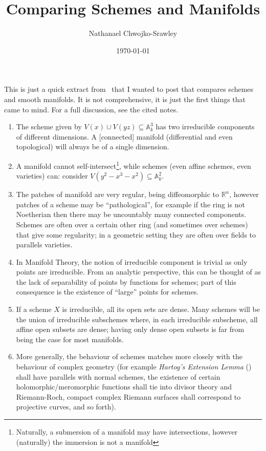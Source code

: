 \documentclass{article}
\title{Comparing Schemes and Manifolds}
\author{Nathanael Chwojko-Srawley}
\date{\today}
\renewcommand{\maketitle}{
    \quad
    \vspace{1em}
  \begin{center}
      \LARGE\bfseries \thetitle \par
      \vspace{0.6em}
      \large
  \end{center}
    \vspace{1em}
}
\newcommand{\A}{{\mathbb{A}}}
\newcommand{\R}{{\mathbb{R}}}
\newcommand{\sse}{\subseteq}
\begin{document}
\maketitle

This is just a quick extract from~\cite{NateAlgGeo} that I wanted to post that compares schemes and smooth
manifolds. It is not comprehensive, it is just the first things that came to mind. For a full discussion, see the cited notes.
\begin{enumerate}
  \item The scheme given by $V(x)\cup V(yz) \sse \A_k^3$ has two irreducible components of different
    dimensions. A [connected] manifold (differential and even topological) will always be of a single dimension.
	\item A manifold cannot self-intersect\footnote{Naturally, a submersion of a manifold may have
			intersections, however (naturally) the immersion is not a manifold}, while schemes (even affine
			schemes, even varieties) can: consider $V(y^2-x^3-x^2) \sse \A_k^2$.
	\item The patches of manifold are very regular, being diffeomorphic to $\R^n$, however patches of a scheme
		may be ``pathological'', for example if the ring is not Noetherian then there may be uncountably many
		connected components. Schemes are often over a certain other ring (and sometimes over schemes) that give
    some regularity; in a geometric setting they are often over fields to parallels varieties.
	\item In Manifold Theory, the notion of irreducible component is trivial as only points are irreducible. From an
		analytic perspective, this can be thought of as the lack of separability of points by functions for
    schemes; part of this consequence is the existence of ``large'' points for schemes.

	\item If a scheme $X$ is irreducible, all its open sets are dense. Many schemes
		will be the union of irreducible subschemes where, in each irreducible subscheme, all affine open subsets
    are dense; having only dense open subsets is far from being the case for most manifolds.

  \item More generally, the behaviour of schemes matches more closely with the behaviour of complex geometry
    (for example \emph{Hartog's Extension Lemma} (\cite[chapter~8]{NateComplexAnalysis}) shall have parallels
    with normal schemes, the existence of certain holomorphic/meromorphic functions shall tie into divisor
    theory and Riemann-Roch, compact complex Riemann surfaces shall correspond to projective curves, and so forth).


\end{enumerate}
\end{document}
